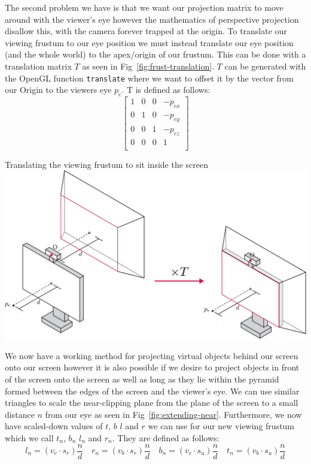 The second problem we have is that we want our projection matrix to move around with the viewer's eye however the mathematics of perspective projection disallow this, with the camera forever trapped at the origin. To translate our viewing frustum to our eye position we must instead translate our eye position (and the whole world) to the apex/origin of our frustum. This can be done with a translation matrix $T$ as seen in Fig~\ref{fig:frust-translation}. $T$ can be generated with the OpenGL function \texttt{translate} where we want to offset it by the vector from our Origin to the viewers eye $p_e$. T is defined as follows:
\[
    \begin{bmatrix}
        1 & 0 & 0 & -p_{ex} \\
        0 & 1 & 0 & -p_{ey} \\
        0 & 0 & 1 & -p_{ez} \\
        0 & 0 & 0 & 1       \\
    \end{bmatrix}
\]

\begin{figureBox}[label={fig:frust-translation}, width=0.8\linewidth]{Translating the viewing frustum to sit inside the screen}
    \includegraphics[width = 0.8\linewidth]{./background/figures/projection/frust-translation.pdf}
\end{figureBox}

We now have a working method for projecting virtual objects behind our screen onto our screen however it is also possible if we desire to project objects in front of the screen onto the screen as well as long as they lie within the pyramid formed between the edges of the screen and the viewer's eye. We can use similar triangles to scale the near-clipping plane from the plane of the screen to a small distance $n$ from our eye as seen in Fig~\ref{fig:extending-near}. Furthermore, we now have scaled-down values of $t$, $b$ $l$ and $r$ we can use for our new viewing frustum which we call $t_n$, $b_n$ $l_n$ and $r_n$. They are defined as follows:
\[
    l_n = (v_c \cdot s_r) \frac{n}{d} \quad r_n = (v_b \cdot s_r) \frac{n}{d} \quad b_n = (v_c \cdot s_u) \frac{n}{d} \quad t_n = (v_b \cdot s_u) \frac{n}{d}
\]

